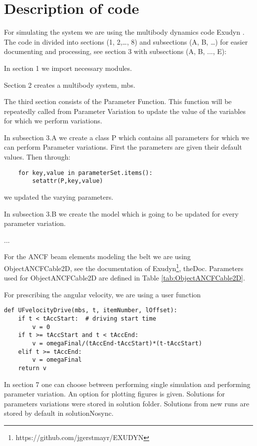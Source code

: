 \section{Description of code}
For simulating the system we are using the multibody dynamics code Exudyn \cite{Gerstmayr2022}.
%
The code in divided into sections (1, 2,…, 8) and subsections (A, B, …) for easier documenting and processing, see section 3 with subsections (A, B, ..., E):
\bi 
\item{In section 1 we import necessary modules.}
\item{Section 2 creates a multibody system, mbs.}
\item{The third section consists of the Parameter Function. This function will be repeatedly called from Parameter Variation to update the value of the variables for which we perform variations.} 
\item{In subsection 3.A we create a class P which contains all parameters for which we can perform Parameter variations. First the parameters are given their default values. Then through:
\pythonstyle
\begin{lstlisting}
	for key,value in parameterSet.items():
		setattr(P,key,value)
\end{lstlisting}		
we updated the varying parameters.}
\item{In subsection 3.B we create the model which is going to be updated for every parameter variation.}
%
\item{...}
%
\item{For the ANCF beam elements modeling the belt we are using ObjectANCFCable2D, see the documentation of Exudyn\footnote{https://github.com/jgerstmayr/EXUDYN}, theDoc.
Parameters used for ObjectANCFCable2D are defined in Table \ref{tab:ObjectANCFCable2D}.}
\item{For prescribing the angular velocity, we are using a user function
\pythonstyle
\begin{lstlisting}
def UFvelocityDrive(mbs, t, itemNumber, lOffset): 
	if t < tAccStart:  # driving start time
		v = 0
	if t >= tAccStart and t < tAccEnd:
		v = omegaFinal/(tAccEnd-tAccStart)*(t-tAccStart)
	elif t >= tAccEnd:
		v = omegaFinal
	return v
\end{lstlisting}                
}
\item{In section 7 one can choose between performing single simulation and performing parameter variation.
An option for plotting figures is given. Solutions for parameters variations were stored in solution folder. Solutions from new runs are stored by default in solutionNosync.} %
